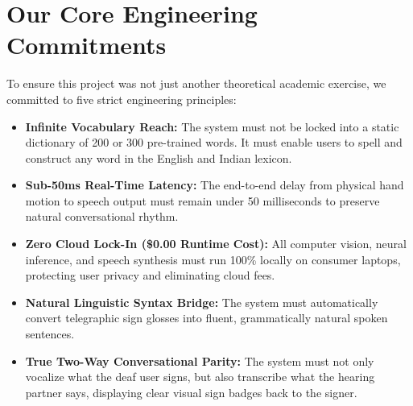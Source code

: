 \section{Our Core Engineering Commitments}
To ensure this project was not just another theoretical academic exercise, we committed to five strict engineering principles:
\begin{itemize}
    \item \textbf{Infinite Vocabulary Reach:} The system must not be locked into a static dictionary of 200 or 300 pre-trained words. It must enable users to spell and construct any word in the English and Indian lexicon.
    \item \textbf{Sub-50ms Real-Time Latency:} The end-to-end delay from physical hand motion to speech output must remain under 50 milliseconds to preserve natural conversational rhythm.
    \item \textbf{Zero Cloud Lock-In (\$0.00 Runtime Cost):} All computer vision, neural inference, and speech synthesis must run 100\% locally on consumer laptops, protecting user privacy and eliminating cloud fees.
    \item \textbf{Natural Linguistic Syntax Bridge:} The system must automatically convert telegraphic sign glosses into fluent, grammatically natural spoken sentences.
    \item \textbf{True Two-Way Conversational Parity:} The system must not only vocalize what the deaf user signs, but also transcribe what the hearing partner says, displaying clear visual sign badges back to the signer.
\end{itemize}
